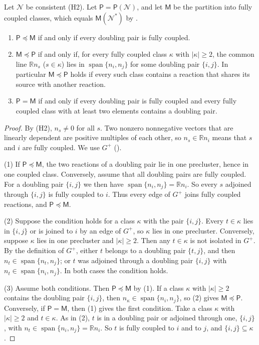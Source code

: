 \documentclass[11pt,a4paper]{report}
\providecommand{\R}{\mathbb{R}}
\newcommand{\Net}{\mathcal{N}}
\newcommand{\spn}{\operatorname{span}}
\newcommand{\Pre}{\mathsf{P}}
\newcommand{\Mips}{\mathsf{M}}
\newcommand{\refi}{\preceq}
\begin{document}
\begin{theorem}\label{thm:criteria}
Let \(\Net\) be consistent (H2). Let \(\Pre=\Pre(\Net)\), and let \(\Mips\) be the partition into fully coupled classes,
which equals \(\Mips(\Net^*)\) by .
\begin{enumerate}
\item \(\Pre\refi\Mips\) if and only if every doubling pair is fully coupled.
\item \(\Mips\refi\Pre\) if and only if, for every fully coupled class \(\kappa\) with \(|\kappa|\ge2\), the common
line \(\R n_s\) (\(s\in\kappa\)) lies in \(\spn\{n_i,n_j\}\) for some doubling pair \(\{i,j\}\). In particular
\(\Mips\refi\Pre\) holds if every such class contains a reaction that shares its source with another reaction.
\item \(\Pre=\Mips\) if and only if every doubling pair is fully coupled and every fully coupled class with at least
two elements contains a doubling pair.
\end{enumerate}
\end{theorem}
\begin{proof}
By (H2), \(n_s\neq0\) for all \(s\). Two nonzero nonnegative vectors that are linearly dependent are positive multiples
of each other, so \(n_s\in\R n_i\) means that \(s\) and \(i\) are fully coupled. We use \(G^+\) ().

(1) If \(\Pre\refi\Mips\), the two reactions of a doubling pair lie in one precluster, hence in one coupled class.
Conversely, assume that all doubling pairs are fully coupled. For a doubling pair \(\{i,j\}\) we then have
\(\spn\{n_i,n_j\}=\R n_i\). So every \(s\) adjoined through \(\{i,j\}\) is fully coupled to \(i\). Thus every edge of
\(G^+\) joins fully coupled reactions, and \(\Pre\refi\Mips\).

(2) Suppose the condition holds for a class \(\kappa\) with the pair \(\{i,j\}\). Every \(t\in\kappa\) lies in
\(\{i,j\}\) or is joined to \(i\) by an edge of \(G^+\), so \(\kappa\) lies in one precluster. Conversely, suppose
\(\kappa\) lies in one precluster and \(|\kappa|\ge2\). Then any \(t\in\kappa\) is not isolated in \(G^+\). By the
definition of \(G^+\), either \(t\) belongs to a doubling pair \(\{t,j\}\), and then \(n_t\in\spn\{n_t,n_j\}\); or
\(t\) was adjoined through a doubling pair \(\{i,j\}\) with \(n_t\in\spn\{n_i,n_j\}\). In both cases the condition
holds.

(3) Assume both conditions. Then \(\Pre\refi\Mips\) by (1). If a class \(\kappa\) with \(|\kappa|\ge2\) contains the
doubling pair \(\{i,j\}\), then \(n_\kappa\in\spn\{n_i,n_j\}\), so (2) gives \(\Mips\refi\Pre\). Conversely, if
\(\Pre=\Mips\), then (1) gives the first condition. Take a class \(\kappa\) with \(|\kappa|\ge2\) and \(t\in\kappa\).
As in (2), \(t\) is in a doubling pair or adjoined through one, \(\{i,j\}\), with \(n_t\in\spn\{n_i,n_j\}=\R n_i\). So
\(t\) is fully coupled to \(i\) and to \(j\), and \(\{i,j\}\subseteq\kappa\).
\end{proof}
\end{document}
